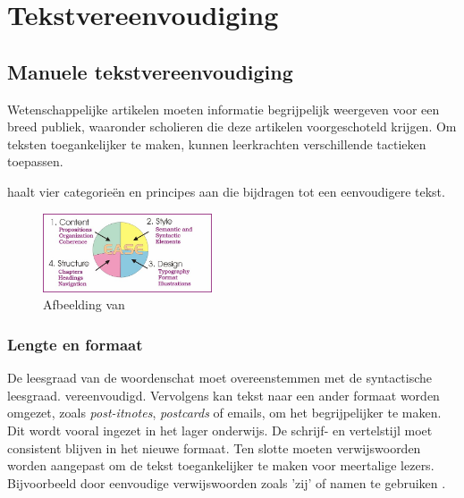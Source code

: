 \section{Tekstvereenvoudiging}


\subsection{Manuele tekstvereenvoudiging}


Wetenschappelijke artikelen moeten informatie begrijpelijk weergeven voor een breed publiek, waaronder scholieren die deze artikelen voorgeschoteld krijgen. Om teksten toegankelijker te maken, kunnen leerkrachten verschillende tactieken toepassen.

\textcite{Dubay2004} haalt vier categorieën en principes aan die bijdragen tot een eenvoudigere tekst.

\begin{figure}[H]
	\begin{center}
		\includegraphics[width=5cm]{img/text-simplification-reading-ease.png}
	\end{center}
	\caption{Afbeelding van \textcite{Dubay2004}}
\end{figure}


\subsubsection{Lengte en formaat}

De leesgraad van de woordenschat moet overeenstemmen met de syntactische leesgraad. vereenvoudigd. Vervolgens kan tekst naar een ander formaat worden omgezet, zoals \textit{post-itnotes}, \textit{postcards} of emails, om het begrijpelijker te maken. Dit wordt vooral ingezet in het lager onderwijs. De schrijf- en vertelstijl moet consistent blijven in het nieuwe formaat. Ten slotte moeten verwijswoorden worden aangepast om de tekst toegankelijker te maken voor meertalige lezers. Bijvoorbeeld door eenvoudige verwijswoorden zoals 'zij' of namen te gebruiken \autocite{Rijkhoff2022}. 

